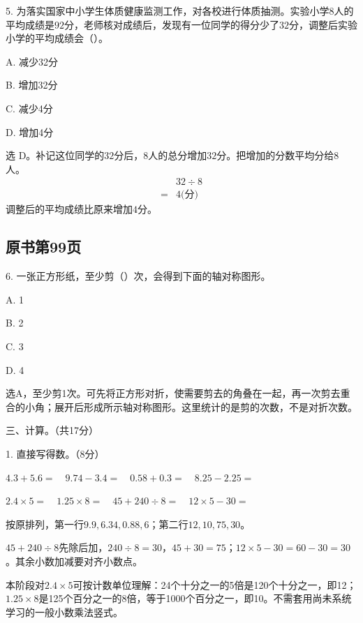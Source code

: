 5. 为落实国家中小学生体质健康监测工作，对各校进行体质抽测。实验小学\(8\)人的平均成绩是\(92\)分，老师核对成绩后，发现有一位同学的得分少了\(32\)分，调整后实验小学的平均成绩会（\hspace{1.8em}）。\par
\noindent A. 减少32分\par
\noindent B. 增加32分\par
\noindent C. 减少4分\par
\noindent D. 增加4分\par
\begin{BookAnswer}
选 D。补记这位同学的\(32\)分后，\allowbreak{}\(8\)人的总分增加\(32\)分。把增加的分数平均分给\(8\)人。
\[
\begin{aligned}
&32\div8\\
={}&4\text{(分)}
\end{aligned}
\]
调整后的平均成绩比原来增加\(4\)分。
\end{BookAnswer}



\subsection*{原书第99页}

6. 一张正方形纸，至少剪（\hspace{1.8em}）次，会得到下面的轴对称图形。\par
\noindent A. 1\par
\noindent B. 2\par
\noindent C. 3\par
\noindent D. 4\par
{}
\begin{BookAnswer}
选A，至少剪1次。可先将正方形对折，使需要剪去的角叠在一起，再一次剪去重合的小角；展开后形成所示轴对称图形。这里统计的是剪的次数，不是对折次数。
\end{BookAnswer}

三、计算。（共17分）\par 1. 直接写得数。（8分）\par \(4.3+5.6=\quad9.74-3.4=\quad0.58+0.3=\quad8.25-2.25=\)\par \(2.4\times5=\quad1.25\times8=\quad45+240\div8=\quad12\times5-30=\)\par
\begin{BookAnswer}
按原排列，第一行\(9.9,6.34,0.88,6\)；第二行\(12,10,75,30\)。\par \(45+240\div8\)先除后加，\allowbreak{}\(240\div8=30\)，\allowbreak{}\(45+30=75\)；\allowbreak{}\(12\times5-30=60-30=30\)。其余小数加减要对齐小数点。\par 本阶段对\(2.4\times5\)可按计数单位理解：24个十分之一的5倍是120个十分之一，即12；\allowbreak{}\(1.25\times8\)是125个百分之一的8倍，等于1000个百分之一，即10。不需套用尚未系统学习的一般小数乘法竖式。
\end{BookAnswer}

